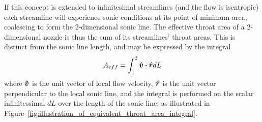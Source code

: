 \documentclass[a4paper, 11pt, oneside]{report}
\begin{document}
If this concept is extended to infinitesimal streamlines (and the flow is isentropic) each streamline will experience sonic conditions at its point of minimum area, coalescing to form the 2-dimensional sonic line. The effective throat area of a 2-dimensional nozzle is thus the sum of its streamlines' throat areas. This is distinct from the sonic line length, and may be expressed by the integral
\begin{equation}\label{effective_throat_area_integral}
	A_{eff} = 
	\int_{1}^2 \vu*{v} \vdot \vu*{r} dL
\end{equation}
where $\vu*{v}$ is the unit vector of local flow velocity, $\vu*{r}$ is the unit vector perpendicular to the local sonic line, and the integral is performed on the scalar infinitessimal $dL$ over the length of the sonic line, as illustrated in Figure~\ref{fig:illustration_of_equivalent_throat_area_integral}.
 		
\end{document}
